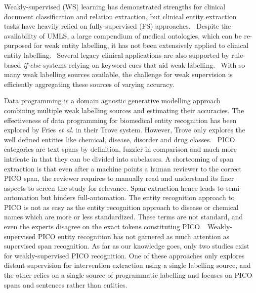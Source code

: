 \documentclass[10.7pt,]{article}
\begin{document}
Weakly-supervised (WS) learning has demonstrated strengths for clinical document classification and relation extraction, but clinical entity extraction tasks have heavily relied on fully-supervised (FS) approaches.~\cite{meng2018weakly,wang2019clinical,mintz2009distant,elangovan2020assigning,weber2020pedl,mallory2020extracting}
Despite the availability of UMLS, a large compendium of medical ontologies, which can be re-purposed for weak entity labelling, it has not been extensively applied to clinical entity labelling.~\cite{humphreys1998unified}
Several legacy clinical applications are also supported by rule-based \textit{if-else} systems relying on keyword cues that aid weak labelling.~\cite{friedlin2008software,kim2017extracting,yang2015automatic}
With so many weak labelling sources available, the challenge for weak supervision is efficiently aggregating these sources of varying accuracy.


Data programming is a domain agnostic generative modelling approach combining multiple weak labelling sources and estimating their accuracies.
The effectiveness of data programming for biomedical entity recognition has been explored by Fries \textit{et al.} in their Trove system.
However, Trove only explores the well defined entities like chemical, disease, disorder and drug classes.~\cite{fries2021ontology}
PICO categories are text spans by definition, fuzzier in comparison and much more intricate in that they can be divided into subclasses.
A shortcoming of span extraction is that even after a machine points a human reviewer to the correct PICO span, the reviewer requires to manually read and understand its finer aspects to screen the study for relevance.
Span extraction hence leads to semi-automation but hinders full-automation.
The entity recognition approach to PICO is not as easy as the entity recognition approach to disease or chemical names which are more or less standardized.
These terms are not standard, and even the experts disagree on the exact tokens constituting PICO.~\cite{brockmeier2019improving}
Weakly-supervised PICO entity recognition has not garnered as much attention as supervised span recognition.
As far as our knowledge goes, only two studies exist for weakly-supervised PICO recognition.
One of these approaches only explores distant supervision for intervention extraction using a single labelling source, and the other relies on a single source of programmatic labelling and focuses on PICO spans and sentences rather than entities.~\cite{liu2021sent2span,dhrangadhariya2022distant}
\end{document}
